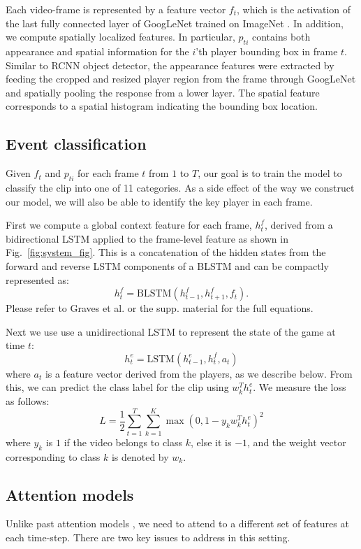 Each video-frame  is represented by a feature vector $f_t$, which is the activation
of the last fully connected layer of GoogLeNet \cite{} trained on ImageNet
\cite{}.  In addition, we compute spatially localized features.  In particular,
$p_{ti}$ contains both appearance and spatial information for the $i$'th
player bounding box in frame $t$. Similar to RCNN object detector\cite{},
the appearance features were extracted by feeding
the cropped and resized player region from the frame through GoogLeNet and
spatially pooling the response from a lower layer. The spatial feature
corresponds to a spatial histogram indicating the bounding box location.  

\subsection{Event classification}

Given $f_t$ and $p_{ti}$ for each frame $t$ from $1$ to $T$, our goal
is to train the model to classify the clip into one of 11 categories. As a side
effect of the way we construct our model, we will also be able to identify the
key player in each frame.

First we compute a global context feature for each frame, $h_t^f$, derived from
a bidirectional LSTM applied to the frame-level feature as shown in Fig.~\ref{fig:system_fig}.
This is a concatenation of the hidden states from the forward and reverse LSTM
components of a BLSTM and can be compactly represented as:
\[
h_t^f = \mbox{BLSTM}(h_{t-1}^f, h_{t+1}^f, f_t).
\]Please refer to Graves et al. \cite{Graves_2013} or the supp. material
for the full equations.

Next we use use a unidirectional LSTM to represent the state of the
game at time $t$:
\[
h_t^e = \mbox{LSTM}(h_{t-1}^e, h_t^f, a_t)
\]
where $a_t$ is a feature vector derived from the players, as we
describe below.
From this, we can predict the class label for the clip using $w_k^T
h_t^e$. We measure the loss as follows:
\begin{equation}
  L =   \frac{1}{2} \sum_{t=1}^T \sum_{k = 1}^K \max (0, 1 - y_k w_k^T h^e_t)^2
\end{equation} 
where $y_k$ is $1$ if the video belongs to class $k$,
else it is $-1$, and the weight vector corresponding to
class $k$ is denoted by $w_k$.

\subsection{Attention models}
Unlike past attention models \cite{}, we need to attend to a different set of
features at each time-step. There are two key issues to address in this
setting.

